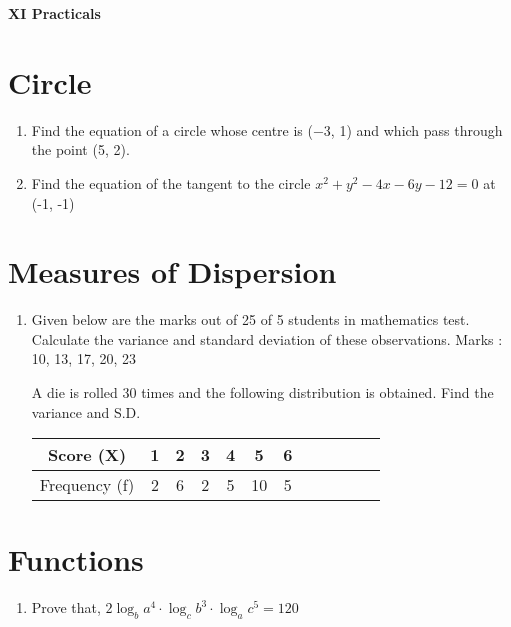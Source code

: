 \documentclass[14pt]{article}
\begin{document}
\centering 
{\large \bf XI Practicals\par}
\vspace{1cm}
\begin{multicols}{2}



\section{Circle}
\noindent
\begin{enumerate}

\item Find the equation of a circle whose centre is
(−3, 1) and which pass through the point (5, 2).

\item Find the equation of the tangent to the circle $x^2 + y^2 - 4x - 6y - 12 = 0$ at (-1, -1)

\end{enumerate} 


\section{Measures of Dispersion}
\noindent
\begin{enumerate}
\item Given below are the marks out of 25
of 5 students in mathematics test. Calculate
the variance and standard deviation of these
observations. Marks : 10, 13, 17, 20, 23

A die is rolled 30 times and the following
distribution is obtained. Find the variance and
S.D.

\begin{tabular}{|c|*{11}{c|}}
\hline Score (X) & 1 & 2 & 3 & 4 & 5 & 6 \\
\hline Frequency (f) & 2 & 6 & 2 & 5 & 10 & 5 \\
\hline
\end{tabular}

\end{enumerate} 

\section{Functions}
\noindent
\begin{enumerate}
\item Prove that, $2\log_ba^4 \cdot \log_cb^3 \cdot \log_ac^5 = 120$


\end{enumerate}
\end{multicols}
\end{document}
